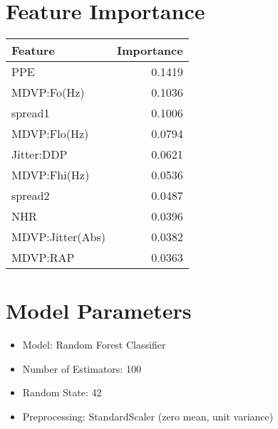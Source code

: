 \documentclass[a4paper,10pt]{article}
\begin{document}
\section*{Feature Importance}
\begin{tabular}{lr}
\toprule
Feature & Importance \\
\midrule
PPE & 0.1419 \\ 
MDVP:Fo(Hz) & 0.1036 \\ 
spread1 & 0.1006 \\ 
MDVP:Flo(Hz) & 0.0794 \\ 
Jitter:DDP & 0.0621 \\ 
MDVP:Fhi(Hz) & 0.0536 \\ 
spread2 & 0.0487 \\ 
NHR & 0.0396 \\ 
MDVP:Jitter(Abs) & 0.0382 \\ 
MDVP:RAP & 0.0363 \\ 

\bottomrule
\end{tabular}

\section*{Model Parameters}
\begin{itemize}
    \item Model: Random Forest Classifier
    \item Number of Estimators: 100
    \item Random State: 42
    \item Preprocessing: StandardScaler (zero mean, unit variance)
\end{itemize}
\end{document}
